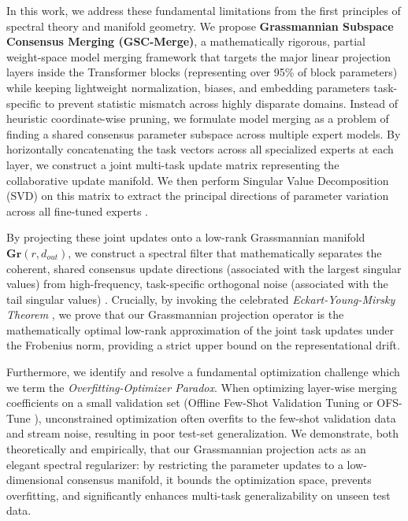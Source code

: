 In this work, we address these fundamental limitations from the first principles of spectral theory and manifold geometry. We propose \textbf{Grassmannian Subspace Consensus Merging (GSC-Merge)}, a mathematically rigorous, partial weight-space model merging framework that targets the major linear projection layers inside the Transformer blocks (representing over 95\% of block parameters) while keeping lightweight normalization, biases, and embedding parameters task-specific to prevent statistic mismatch across highly disparate domains. Instead of heuristic coordinate-wise pruning, we formulate model merging as a problem of finding a shared consensus parameter subspace across multiple expert models. By horizontally concatenating the task vectors across all specialized experts at each layer, we construct a joint multi-task update matrix representing the collaborative update manifold. We then perform Singular Value Decomposition (SVD) on this matrix to extract the principal directions of parameter variation across all fine-tuned experts \cite{golub1996matrix}.

By projecting these joint updates onto a low-rank Grassmannian manifold $\mathbf{Gr}(r, d_{out})$, we construct a spectral filter that mathematically separates the coherent, shared consensus update directions (associated with the largest singular values) from high-frequency, task-specific orthogonal noise (associated with the tail singular values) \cite{edelman1998geometry}. Crucially, by invoking the celebrated \emph{Eckart-Young-Mirsky Theorem} \cite{eckart1936approximation}, we prove that our Grassmannian projection operator is the mathematically optimal low-rank approximation of the joint task updates under the Frobenius norm, providing a strict upper bound on the representational drift.

Furthermore, we identify and resolve a fundamental optimization challenge which we term the \emph{Overfitting-Optimizer Paradox}. When optimizing layer-wise merging coefficients on a small validation set (Offline Few-Shot Validation Tuning or OFS-Tune \cite{ofstune}), unconstrained optimization often overfits to the few-shot validation data and stream noise, resulting in poor test-set generalization. We demonstrate, both theoretically and empirically, that our Grassmannian projection acts as an elegant spectral regularizer: by restricting the parameter updates to a low-dimensional consensus manifold, it bounds the optimization space, prevents overfitting, and significantly enhances multi-task generalizability on unseen test data.


